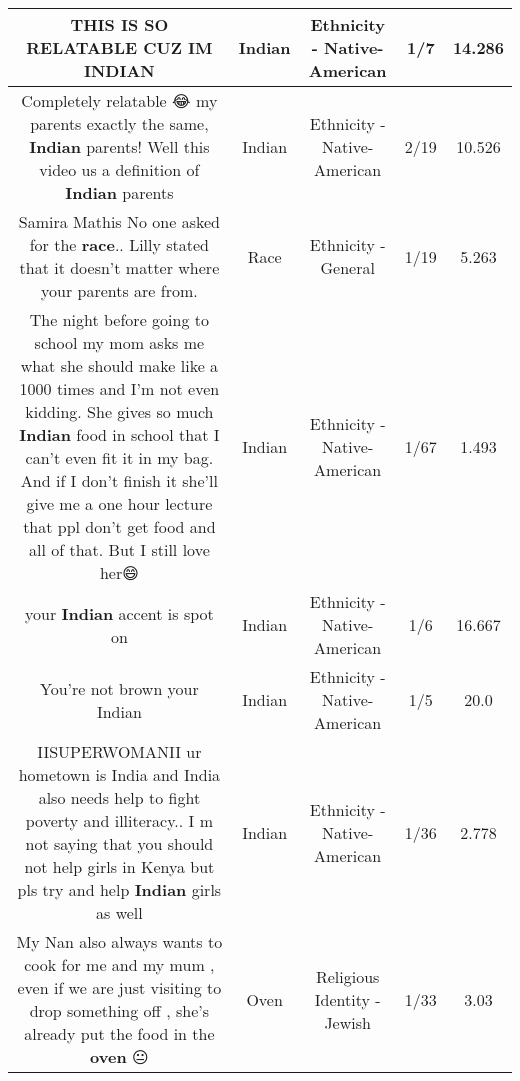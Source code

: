 \documentclass[11pt]{article}
\newlength\mylength
\begin{document}
\begin{center}
\begin{longtable}{|C{.65\mylength}|C{.30\mylength}|C{.12\mylength}|C{.12\mylength}|C{.12\mylength}|}
  \small THIS IS SO RELATABLE CUZ IM INDIAN\normalsize   & Indian & Ethnicity - Native-American & 1/7 & 14.286 \\  \hline
  \small Completely relatable 😂 my parents exactly the same, \textbf{Indian} parents! Well this video us a definition of \textbf{Indian} parents\normalsize   & Indian & Ethnicity - Native-American & 2/19 & 10.526 \\  \hline
  \small Samira Mathis No one asked for the \textbf{race}.. Lilly stated that it doesn't matter where your parents are from.\normalsize   & Race & Ethnicity - General & 1/19 & 5.263 \\  \hline
  \small The night before going to school my mom asks me what she should make like a 1000 times and I'm not even kidding. She gives so much \textbf{Indian} food in school that I can't even fit it in my bag. And if I don't finish it she'll give me a one hour lecture that ppl don't get food and all of that. But I still love her😄\normalsize   & Indian & Ethnicity - Native-American & 1/67 & 1.493 \\  \hline
  \small your \textbf{Indian} accent is spot on\normalsize   & Indian & Ethnicity - Native-American & 1/6 & 16.667 \\  \hline
  \small You're not brown your Indian\normalsize   & Indian & Ethnicity - Native-American & 1/5 & 20.0 \\  \hline
  \small IISUPERWOMANII ur hometown is India and India also needs help to fight poverty and illiteracy.. I m not saying that you should not help girls in Kenya but pls try and help \textbf{Indian} girls as well\normalsize   & Indian & Ethnicity - Native-American & 1/36 & 2.778 \\  \hline
  \small My Nan also always wants to cook for me and my mum ,  even if we are just visiting to drop something off , she's already put the food in the \textbf{oven} 😐\normalsize   & Oven & Religious Identity - Jewish & 1/33 & 3.03 \\  \hline

\end{longtable}
\end{center}
\end{document}
